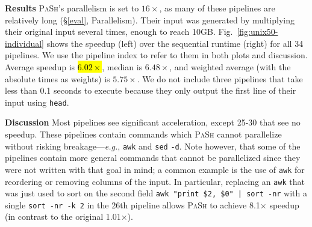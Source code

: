 \documentclass[sigplan, review, screen, anonymous]{acmart}
\newcommand{\eg}{{\em e.g.}, }
\newcommand{\heading}[1]{\vspace{4pt}\noindent\textbf{#1}\enspace}
\newcommand{\ttt}[1]{\texttt{#1}}
\newcommand{\todo}[1]{\hl{#1}\xspace}
\newcommand{\nv}[1]{[{\color{cyan}nv: #1}]}
\newcommand{\sx}[1]{(\S\ref{#1})}
\newcommand{\sys}{{\scshape PaSh}\xspace}
\begin{document}
\heading{Results}
\sys's parallelism is set to $16\times$, as many of these pipelines are relatively long (\S\ref{eval}, Parallelism).
Their input was generated by multiplying their original input several times, enough to reach 10GB.
Fig.~\ref{fig:unix50-individual} shows the speedup (left) over the sequential runtime (right) for all 34 pipelines. We use the pipeline index to refer to them in both plots and discussion.
Average speedup is \todo{$6.02\times$}, median is $6.48\times$, and weighted average (with the absolute times as weights) is $5.75\times$.
We do not include three pipelines that take less than 0.1 seconds to execute because they only output the first line of their input using \ttt{head}.


\heading{Discussion}
Most pipelines see significant acceleration, except 25-30
  that see no speedup. 
These pipelines contain commands which \sys cannot parallelize without risking breakage---\eg \ttt{awk} and \ttt{sed} \ttt{-d}. %
Note however, that some of the pipelines contain more general commands that cannot be parallelized since they were not written with that goal in mind; a common example is the use of \ttt{awk} for reordering or removing columns of the input.
In particular, replacing an \ttt{awk} that was just used to sort on the second field \ttt{awk "{print \$2, \$0}" | sort -nr} with a single \ttt{sort -nr -k 2} in the 
  26th pipeline allows \sys to achieve 8.1$\times$ speedup (in contrast to the original 1.01$\times$).

\end{document}
